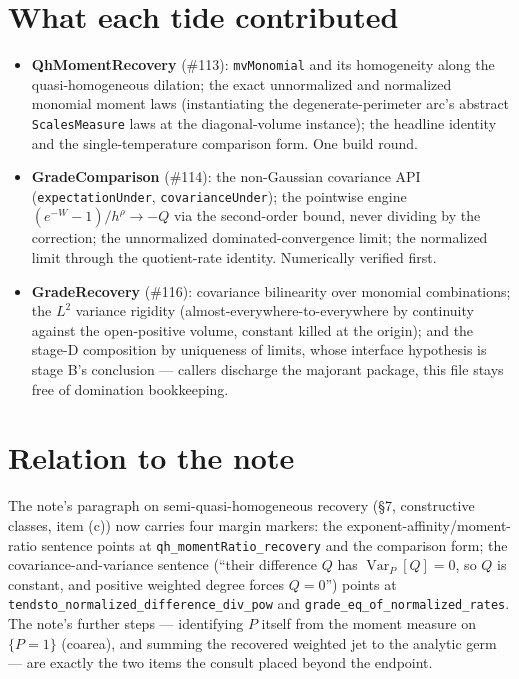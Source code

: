 \documentclass[11pt]{article}
\newcommand{\code}[1]{\texttt{#1}}
\begin{document}
\section{What each tide contributed}

\begin{itemize}
\item \textbf{QhMomentRecovery} (\#113): \code{mvMonomial} and its
homogeneity along the quasi-homogeneous dilation; the exact
unnormalized and normalized monomial moment laws (instantiating the
degenerate-perimeter arc's abstract \code{ScalesMeasure} laws at the
diagonal-volume instance); the headline identity and the
single-temperature comparison form. One build round.
\item \textbf{GradeComparison} (\#114): the non-Gaussian covariance
API (\code{expectationUnder}, \code{covarianceUnder}); the pointwise
engine $(e^{-W}-1)/h^\rho \to -Q$ via the second-order bound, never
dividing by the correction; the unnormalized dominated-convergence
limit; the normalized limit through the quotient-rate identity.
Numerically verified first.
\item \textbf{GradeRecovery} (\#116): covariance bilinearity over
monomial combinations; the $L^2$ variance rigidity
(almost-everywhere-to-everywhere by continuity against the
open-positive volume, constant killed at the origin); and the stage-D
composition by uniqueness of limits, whose interface hypothesis is
stage B's conclusion --- callers discharge the majorant package, this
file stays free of domination bookkeeping.
\end{itemize}

\section{Relation to the note}

The note's paragraph on semi-quasi-homogeneous recovery (\S7,
constructive classes, item (c)) now carries four margin markers: the
exponent-affinity/moment-ratio sentence points at
\code{qh\_momentRatio\_recovery} and the comparison form; the
covariance-and-variance sentence (``their difference $Q$ has
$\operatorname{Var}_P[Q] = 0$, so $Q$ is constant, and positive
weighted degree forces $Q = 0$'') points at
\code{tendsto\_normalized\_difference\_div\_pow} and
\code{grade\_eq\_of\_normalized\_rates}. The note's further steps ---
identifying $P$ itself from the moment measure on $\{P = 1\}$
(coarea), and summing the recovered weighted jet to the analytic germ
--- are exactly the two items the consult placed beyond the endpoint.
\end{document}
